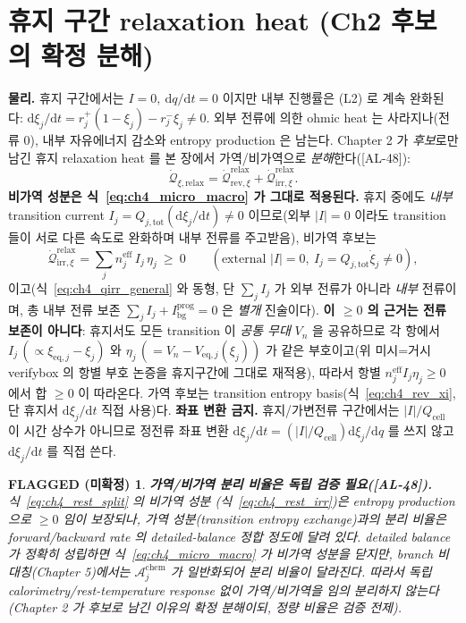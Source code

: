 \documentclass[11pt,a4paper]{article}
\newtheorem*{flagbox}{FLAGGED (미확정)}
\newcommand{\dd}{\mathrm{d}}
\newcommand{\eff}{\mathrm{eff}}
\newcommand{\eq}{\mathrm{eq}}
\newcommand{\bg}{\mathrm{bg}}
\newcommand{\cell}{\mathrm{cell}}
\newcommand{\tot}{\mathrm{tot}}
\newcommand{\irr}{\mathrm{irr}}
\newcommand{\rev}{\mathrm{rev}}
\newcommand{\rlx}{\mathrm{relax}}
\newcommand{\prog}{\mathrm{prog}}
\newcommand{\chem}{\mathrm{chem}}
\newcommand{\AL}[1]{\textsf{[AL-#1]}}
\begin{document}
\section{휴지 구간 relaxation heat (Ch2 후보의 확정 분해)}\label{sec:ch4_rest}
\textbf{물리.} 휴지 구간에서는 $I=0,\ \dd q/\dd t=0$ 이지만 내부 진행률은 (L2) 로 계속 완화된다:
$\dd\xi_j/\dd t=r_j^+(1-\xi_j)-r_j^-\xi_j\ne0$. 외부 전류에 의한 ohmic heat 는 사라지나(전류 $0$), 내부
자유에너지 감소와 entropy production 은 남는다. Chapter 2 가 \emph{후보}로만 남긴 휴지 relaxation heat 를
본 장에서 가역/비가역으로 \emph{분해}한다(\AL{48}):
\begin{equation}
\dot{\mathcal Q}_{\xi,\rlx}=\dot{\mathcal Q}_{\rev,\xi}^{\rlx}+\dot{\mathcal Q}_{\irr,\xi}^{\rlx}.
\label{eq:ch4_rest_split}
\end{equation}
\textbf{비가역 성분은 식~\eqref{eq:ch4_micro_macro} 가 그대로 적용된다.} 휴지 중에도 \emph{내부} transition
current $I_j=Q_{j,\tot}(\dd\xi_j/\dd t)\ne0$ 이므로(외부 $|I|=0$ 이라도 transition 들이 서로 다른 속도로
완화하며 내부 전류를 주고받음), 비가역 후보는
\begin{equation}
\dot{\mathcal Q}_{\irr,\xi}^{\rlx}=\sum_j n_j^{\eff}\,I_j\,\eta_j\ \ge\ 0\qquad(\text{external }|I|=0,\ I_j=Q_{j,\tot}\dot\xi_j\ne0),
\label{eq:ch4_rest_irr}
\end{equation}
이고(식~\eqref{eq:ch4_qirr_general} 와 동형, 단 $\sum_j I_j$ 가 외부 전류가 아니라 \emph{내부} 전류이며, 총 내부
전류 보존 $\sum_j I_j+I_\bg^{\prog}=0$ 은 \emph{별개} 진술이다). \textbf{이 $\ge0$ 의 근거는 전류 보존이 아니다}:
휴지서도 모든 transition 이 \emph{공통 무대} $V_n$ 을 공유하므로 각 항에서 $I_j\,(\propto\xi_{\eq,j}-\xi_j)$ 와
$\eta_j\,(=V_n-V_{\eq,j}(\xi_j))$ 가 같은 부호이고(위 미시=거시 verifybox 의 항별 부호 논증을 휴지구간에 그대로
재적용), 따라서 항별 $n_j^{\eff}I_j\eta_j\ge0$ 에서 합 $\ge0$ 이 따라온다. 가역 후보는 transition entropy
basis(식~\eqref{eq:ch4_rev_xi}, 단 휴지서 $\dd\xi_j/\dd t$ 직접 사용)다. \textbf{좌표 변환 금지.} 휴지/가변전류 구간에서는 $|I|/Q_\cell$ 이 시간 상수가
아니므로 정전류 좌표 변환 $\dd\xi_j/\dd t=(|I|/Q_\cell)\dd\xi_j/\dd q$ 를 쓰지 않고 $\dd\xi_j/\dd t$ 를 직접 쓴다.
\begin{flagbox}
\textbf{가역/비가역 분리 비율은 독립 검증 필요(\AL{48}).} 식~\eqref{eq:ch4_rest_split} 의 비가역 성분
(식~\eqref{eq:ch4_rest_irr})은 entropy production 으로 $\ge0$ 임이 보장되나, 가역 성분(transition entropy
exchange)과의 \emph{분리 비율}은 forward/backward rate 의 detailed-balance 정합 정도에 달려 있다. detailed
balance 가 정확히 성립하면 식~\eqref{eq:ch4_micro_macro} 가 비가역 성분을 닫지만, branch 비대칭(Chapter 5)에서는
$\mathcal A_j^{\chem}$ 가 일반화되어 분리 비율이 달라진다. 따라서 독립 calorimetry/rest-temperature response
없이 가역/비가역을 임의 분리하지 않는다(Chapter 2 가 후보로 남긴 이유의 확정 분해이되, \emph{정량} 비율은
검증 전제).
\end{flagbox}
\end{document}
